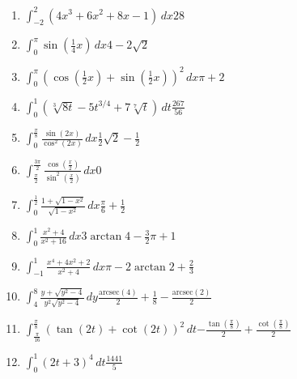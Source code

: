 \begin{enumerate}

\item {$\int_{-2}^{2}\left( 4x^{3}+6x^{2}+8x-1\right)\,dx$}{$28$}


\item {$\int_{0}^{\pi}\sin\left( \frac{1}{4}x \right)\,dx$}{$4 - 2\sqrt{2}$}


\item {$\int_{0}^{\pi}\left( \cos\left( \frac{1}{2}x \right) + \sin\left( \frac{1}{2}x \right) \right)^{2}\,dx$}{$\pi + 2$}


\item {$\int_{0}^{1}\left( \sqrt[3]{8t} - 5t^{3/4} + 7\sqrt[7]{t} \right)\,dt$}{$\frac{267}{56}$}


\item {$\int_{0}^{\frac{\pi}{8}} \frac{\sin(2x)}{\cos^{2}(2x)}\,dx$}{$\frac{1}{2}\sqrt{2} - \frac{1}{2}$}


\item {$\int_{\frac{\pi}{2}}^{\frac{3\pi}{2}} \frac{\cos\left( \frac{x}{2} \right)}{\sin^{2}\left( \frac{x}{2} \right)}\,dx$}{$0$}


\item {$\int_{0}^{\frac{1}{2}} \frac{1 + \sqrt{1 - x^{2}}}{\sqrt{1 - x^{2}}}\,dx$}{$\frac{\pi}{6} + \frac{1}{2}$}


\item {$\int_{0}^{1} \frac{x^{2} + 4}{x^{2} + 16}\,dx$}{$3\arctan 4 - \frac{3}{2}\pi + 1$}


\item {$\int_{-1}^{1} \frac{x^{4} + 4x^{2} + 2}{x^{2} + 4}\,dx$}{$\pi - 2\arctan 2 + \frac{2}{3}$}


\item {$\int_{4}^{8} \frac{y + \sqrt{y^{2} - 4}}{y^{2}\sqrt{y^{2} - 4}}\,dy$}{$\frac{\text{arcsec}(4)}{2} + \frac{1}{8} - \frac{\text{arcsec}(2)}{2}$}


\item {$\int_{\frac{\pi}{16}}^{\frac{\pi}{8}} \left( \tan(2t) + \cot(2t) \right)^{2}\,dt$}{$-\frac{\tan(\frac{\pi}{8})}{2} + \frac{\cot(\frac{\pi}{8})}{2}$}


\item {$\int_{0}^{1} \left( 2t + 3 \right)^{4}\,dt$}{$\frac{1441}{5}$}

\end{enumerate}





